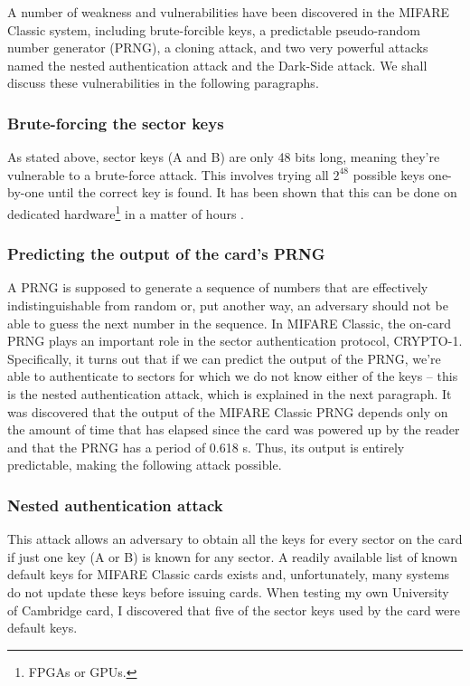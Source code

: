 \documentclass[12pt,a4paper,twoside,openright]{report}
\begin{document}
A number of weakness and vulnerabilities have been discovered in the MIFARE Classic system, including brute-forcible keys, a predictable pseudo-random number generator (PRNG), a cloning attack, and two very powerful attacks named the nested authentication attack and the Dark-Side attack. We shall discuss these vulnerabilities in the following paragraphs.

\subsubsection{Brute-forcing the sector keys}

As stated above, sector keys (A and B) are only 48 bits long, meaning they're vulnerable to a brute-force attack. This involves trying all $2^{48}$ possible keys one-by-one until the correct key is found. It has been shown that this can be done on dedicated hardware\footnote{FPGAs or GPUs.} in a matter of hours \cite{mifarebruteforce}.

\subsubsection{Predicting the output of the card's PRNG}

A PRNG is supposed to generate a sequence of numbers that are effectively indistinguishable from random or, put another way, an adversary should not be able to guess the next number in the sequence. In MIFARE Classic, the on-card PRNG plays an important role in the sector authentication protocol, CRYPTO-1. Specifically, it turns out that if we can predict the output of the PRNG, we're able to authenticate to sectors for which we do not know either of the keys -- this is the nested authentication attack, which is explained in the next paragraph. It was discovered that the output of the MIFARE Classic PRNG depends only on the amount of time that has elapsed since the card was powered up by the reader and that the PRNG has a period of 0.618 s. Thus, its output is entirely predictable, making the following attack possible.

\subsubsection{Nested authentication attack}

This attack allows an adversary to obtain all the keys for every sector on the card if just one key (A or B) is known for any sector. A readily available list of known default keys for MIFARE Classic cards exists and, unfortunately, many systems do not update these keys before issuing cards. When testing my own University of Cambridge card, I discovered that five of the sector keys used by the card were default keys.
\end{document}

